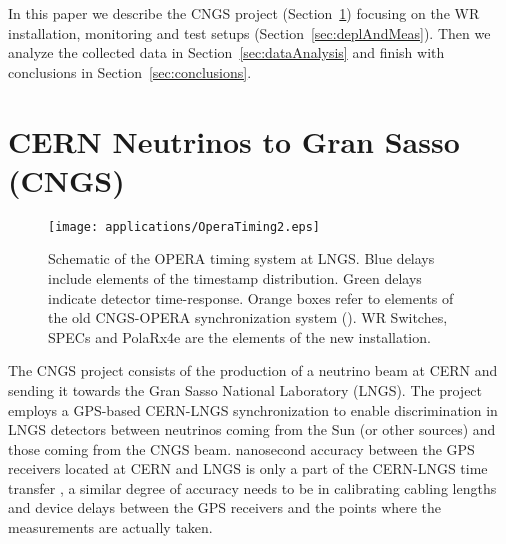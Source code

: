 In this paper we describe the CNGS project (Section~\ref{sec:CNGS}) focusing on the 
WR installation, monitoring and test setups (Section~\ref{sec:deplAndMeas}). 
Then we analyze the collected data in Section~\ref{sec:dataAnalysis} and finish with conclusions
in Section~\ref{sec:conclusions}.



\section{CERN Neutrinos to Gran Sasso (CNGS)}
\label{sec:CNGS}

\begin{figure}[!t]
\centering
\texttt{[image: applications/OperaTiming2.eps]}
\caption{Schematic of the OPERA timing system at LNGS. Blue delays include elements of the 
timestamp distribution. Green delays indicate detector time-response. 
Orange boxes refer to elements of the old CNGS-OPERA synchronization system (\cite{biblio:TOF}). 
WR Switches, SPECs and PolaRx4e are the elements of the new installation.}
\label{fig:operaTiming}
\end{figure}


The CNGS project \cite{biblio:CNGS2000} consists of the production of a neutrino beam at CERN and sending
it towards the Gran Sasso National Laboratory (LNGS). The project employs a GPS-based CERN-LNGS 
synchronization \cite{biblio:BECOHT_CNGS} to enable discrimination in LNGS detectors between 
neutrinos coming from the Sun (or other sources) and those coming from the CNGS beam. 
 nanosecond accuracy between the GPS receivers located at CERN and LNGS is only a part of the 
CERN-LNGS time transfer , a similar degree of accuracy needs to be 
 in 
calibrating cabling lengths and device delays between the GPS receivers and the points where
the measurements are actually taken. 

